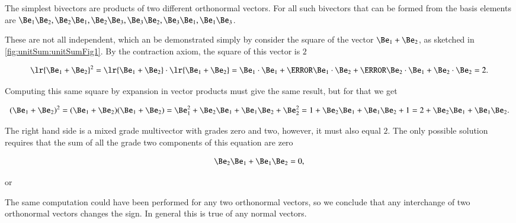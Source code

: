 %
%
The simplest bivectors are products of two different orthonormal vectors.  For  all such bivectors that can be formed from the basis elements are \( \Be_1 \Be_2, \Be_2 \Be_1, \Be_2 \Be_3, \Be_3 \Be_2, \Be_3 \Be_1, \Be_1 \Be_3 \).

These are not all independent, which an be demonstrated simply by consider the square of the vector \( \Be_1 + \Be_2 \),
as sketched in \cref{fig:unitSum:unitSumFig1}.
By the contraction axiom, the square of this vector is \( 2 \)

\begin{dmath}\label{eqn:multivector:420}
\lr{ \Be_1 + \Be_2 }^2 =
\lr{ \Be_1 + \Be_2 } \cdot
\lr{ \Be_1 + \Be_2 }
=
\Be_1 \cdot \Be_1
+
\cancel{\Be_1 \cdot \Be_2}
+
\cancel{\Be_2 \cdot \Be_1}
+
\Be_2 \cdot \Be_2
=
2.
\end{dmath}

Computing this same square by expansion in vector products must give the same result, but for that we get

\begin{dmath}\label{eqn:gaTutorial:80}
(\Be_1 + \Be_2)^2
= (\Be_1 + \Be_2)(\Be_1 + \Be_2)
= \Be_1^2 + \Be_2 \Be_1 + \Be_1 \Be_2 + \Be_2^2
= 1 + \Be_2 \Be_1 + \Be_1 \Be_2 + 1
= 2 + \Be_2 \Be_1 + \Be_1 \Be_2.
\end{dmath}

The right hand side is a mixed grade multivector with grades zero and two, however, it must also equal \( 2 \).
The only possible solution requires that the sum of all the grade two components of this equation are zero

\begin{dmath}\label{eqn:multivector:280}
\Be_2 \Be_1 + \Be_1 \Be_2 = 0,
\end{dmath}

or

The same computation could have been performed for any two orthonormal vectors, so we conclude that any interchange of two orthonormal vectors changes the sign.  In general this is true of any normal vectors.


